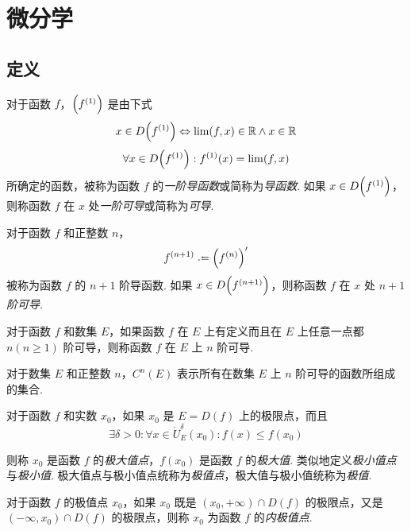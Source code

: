\section{微分学}
\subsection{定义}
\begin{definition}
    对于函数 $f$，$\Bigl(f^{(1)}\Bigr)$ 是由下式
    \[x \in D\Bigl(f^{(1)}\Bigr) \Leftrightarrow \lim(f,x) \in \mathbb{R} \wedge x \in \mathbb{R}\]
    \[\forall x \in D\Bigl(f^{(1)}\Bigr): f^{(1)}(x) = \lim(f,x)\]
    所确定的函数，被称为函数 $f$ 的\emph{一阶导函数}或简称为\emph{导函数}. 如果 $x \in D\Bigl(f^{(1)}\Bigr)$，则称函数 $f$ 在 $x$ 处\emph{一阶可导}或简称为\emph{可导}.
\end{definition}

\begin{definition}
    对于函数 $f$ 和正整数 $n$，
    \[f^{(n+1)} \defeq \Bigl(f^{(n)}\Bigr)'\]
    被称为函数 $f$ 的 $n+1$ 阶导函数. 如果 $x \in D\Bigl(f^{(n+1)}\Bigr)$，则称函数 $f$ 在 $x$ 处 \emph{$n+1$ 阶可导}.
\end{definition}\vspace{9pt}

\begin{definition}
    对于函数 $f$ 和数集 $E$，如果函数 $f$ 在 $E$ 上有定义而且在 $E$ 上任意一点都 $n(n \geqslant 1)$ 阶可导，则称函数 $f$ 在 $E$ 上 $n$ 阶可导.
\end{definition}\vspace{9pt}

\begin{definition}
    对于数集 $E$ 和正整数 $n$，$C^n(E)$ 表示所有在数集 $E$ 上 $n$ 阶可导的函数所组成的集合.
\end{definition}

\begin{definition}
    对于函数 $f$ 和实数 $x_0$，如果 $x_0$ 是 $E = D(f)$ 上的极限点，而且
    \[\exists \delta > 0: \forall x \in \mathring{U}_E^\delta(x_0): f(x) \leqslant f(x_0)\]
    
    则称 $x_0$ 是函数 $f$ 的\emph{极大值点}，$f(x_0)$ 是函数 $f$ 的\emph{极大值}. 类似地定义\emph{极小值点}与\emph{极小值}. 极大值点与极小值点统称为\emph{极值点}，极大值与极小值统称为\emph{极值}.
\end{definition}\vspace{9pt}

\begin{definition}
    对于函数 $f$ 的极值点 $x_0$，如果 $x_0$ 既是 $(x_0, +\infty) \cap D(f)$ 的极限点，又是 $(-\infty, x_0) \cap D(f)$ 的极限点，则称 $x_0$ 为函数 $f$ 的\emph{内极值点}.
\end{definition}\vspace{9pt}


